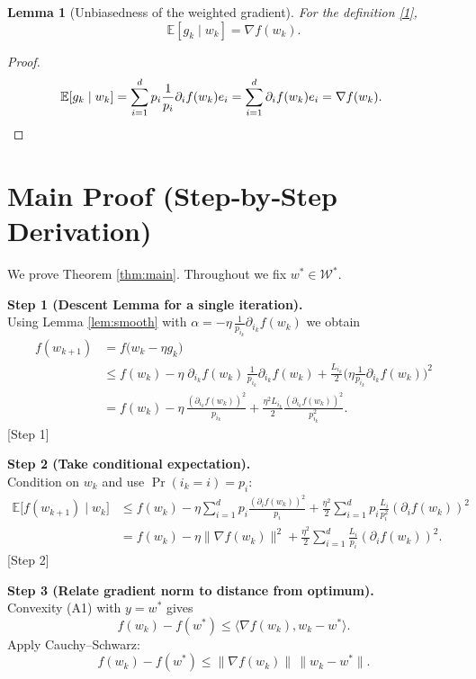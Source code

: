 \documentclass[11pt]{article}
\newtheorem{lemma}{Lemma}
\newcommand{\EE}{\mathbb{E}}
\begin{document}
\begin{lemma}[Unbiasedness of the weighted gradient]\label{lem:unbiased}
For the definition \eqref{1},
\[
\EE\!\left[g_k\mid w_k\right]=\nabla f(w_k).
\]
\end{lemma}
\begin{proof}
\[
\EE\!\left[g_k\mid w_k\right]
=\sum_{i=1}^{d}p_i\frac{1}{p_i}\partial_i f(w_k)e_i
=\sum_{i=1}^{d}\partial_i f(w_k)e_i
=\nabla f(w_k).
\qquad\qedhere
\]
\end{proof}

\section*{Main Proof (Step‑by‑Step Derivation)}
We prove Theorem \ref{thm:main}. Throughout we fix $w^{*}\in\mathcal W^{*}$.

\noindent\textbf{Step 1 (Descent Lemma for a single iteration).}\\
Using Lemma \ref{lem:smooth} with $\alpha=-\eta\,\frac{1}{p_{i_k}}\partial_{i_k}f(w_k)$ we obtain
\begin{align}
f(w_{k+1})
&=f\!\big(w_k-\eta g_k\big) \nonumber\\
&\le f(w_k)-\eta\;\partial_{i_k}f(w_k)\,\frac{1}{p_{i_k}}\partial_{i_k}f(w_k)
   +\frac{L_{i_k}}{2}\Big(\eta\frac{1}{p_{i_k}}\partial_{i_k}f(w_k)\Big)^{2} \nonumber\\
&=f(w_k)-\eta\,\frac{(\partial_{i_k}f(w_k))^{2}}{p_{i_k}}
   +\frac{\eta^{2}L_{i_k}}{2}\frac{(\partial_{i_k}f(w_k))^{2}}{p_{i_k}^{2}} .
\tag{5}
\end{align}
\hfill[Step 1]

\noindent\textbf{Step 2 (Take conditional expectation).}\\
Condition on $w_k$ and use $\Pr(i_k=i)=p_i$:
\begin{align}
\EE\!\big[f(w_{k+1})\mid w_k\big]
&\le f(w_k)-\eta\sum_{i=1}^{d}p_i\frac{(\partial_i f(w_k))^{2}}{p_i}
   +\frac{\eta^{2}}{2}\sum_{i=1}^{d}p_i\frac{L_i}{p_i^{2}}(\partial_i f(w_k))^{2} \nonumber\\
&= f(w_k)-\eta\|\nabla f(w_k)\|^{2}
   +\frac{\eta^{2}}{2}\sum_{i=1}^{d}\frac{L_i}{p_i}(\partial_i f(w_k))^{2}.
\tag{6}
\end{align}
\hfill[Step 2]

\noindent\textbf{Step 3 (Relate gradient norm to distance from optimum).}\\
Convexity (A1) with $y=w^{*}$ gives
\[
f(w_k)-f(w^{*})\le\langle\nabla f(w_k),w_k-w^{*}\rangle .
\tag{7}
\]
Apply Cauchy–Schwarz:
\[
f(w_k)-f(w^{*})\le \|\nabla f(w_k)\|\,\|w_k-w^{*}\|.
\tag{8}
\]
\end{document}
